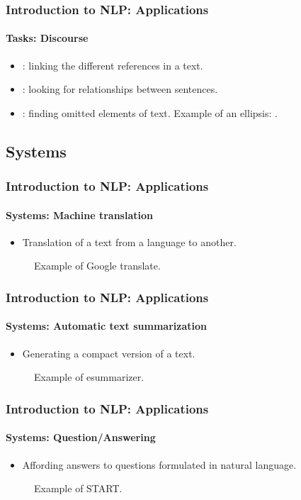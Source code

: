 \documentclass[xcolor=table]{beamer}
\begin{document}
\begin{frame}
\frametitle{Introduction to NLP: Applications}
\framesubtitle{Tasks: Discourse}

\begin{itemize}
	\item {}: linking the different references in a text.
	\item {}: looking for relationships between sentences.
	\item {}: finding omitted elements of text.
	Example of an ellipsis: .
\end{itemize}

\end{frame}

\subsection{Systems}

\begin{frame}
\frametitle{Introduction to NLP: Applications}
\framesubtitle{Systems: Machine translation}

\begin{itemize}
	\item Translation of a text from a language to another.
\end{itemize}

\begin{figure}
	\caption{Example of Google translate.}
\end{figure}

\end{frame}

\begin{frame}
\frametitle{Introduction to NLP: Applications}
\framesubtitle{Systems: Automatic text summarization}

\begin{itemize}
	\item Generating a compact version of a text.
\end{itemize}

\begin{figure}
	\caption{Example of esummarizer.}
\end{figure}

\end{frame}

\begin{frame}
\frametitle{Introduction to NLP: Applications}
\framesubtitle{Systems: Question/Answering}

\begin{itemize}
	\item Affording answers to questions formulated in natural language.
\end{itemize}

\begin{figure}
	\caption{Example of START.}
\end{figure}

\end{frame}
\end{document}
